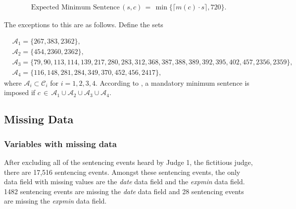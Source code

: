 \documentclass[11pt, oneside]{article}   	%
\theoremstyle{ModifiedStyle}
\begin{document}
        \begin{align}
          \text{Expected Minimum Sentence}\,(s,c) \,=\, \min \big\{ \big\lceil m(c) \cdot s \big\rceil ,720 \big\}.
          \label{Equation_Expected_Minimum_Sentence}
        \end{align}

        The exceptions to this are as follows. Define the sets

        \begin{align*}
          &\mathcal{A}_1 = \{267, 383, 2362\},\\
          &\mathcal{A}_2 = \{454, 2360, 2362\},\\
          &\mathcal{A}_3 = \{79, 90, 113, 114, 139, 217, 280, 283, 312, 368, 387, 388, 389, 392, 395, 402, 457, 2356, 2359\}, \\ &\mathcal{A}_4 = \{116, 148, 281, 284, 349, 370, 452, 456, 2417\},
        \end{align*}
        where $\mathcal{A}_i \subset \mathcal{C}_i$ for $i=1,2,3,4$. According to \cite{hester2017conditional}, a mandatory minimum sentence is imposed if $c \,\in\, \mathcal{A}_1 \cup \mathcal{A}_2 \cup \mathcal{A}_3 \cup \mathcal{A}_4$.

  \subsection{Missing Data}
    \subsubsection{Variables with missing data}
      After excluding all of the sentencing events heard by Judge 1, the fictitious judge, there are 17,516 sentencing events. Amongst these sentencing events, the only data field with missing values are the \emph{date} data field and the \emph{expmin} data field. 1482 sentencing events are missing the \emph{date} data field and 28 sentencing events are missing the \emph{expmin} data field.
\end{document}

